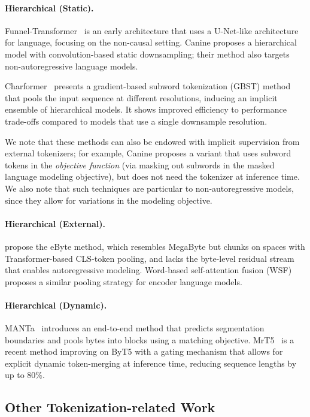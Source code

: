 \documentclass{article}
\newcommand{\citep}{\parencite}
\newcommand{\citet}{\textcite}
\theoremstyle{plain}
\theoremstyle{remark}
\begin{document}
\paragraph{Hierarchical (Static).}
Funnel-Transformer~\citep{dai2020funnel} is an early architecture that uses a U-Net-like architecture for language, focusing on the non-causal setting.
Canine \citep{Canine} proposes a hierarchical model with convolution-based static downsampling; their method also targets non-autoregressive language models.

Charformer~\citep{CharFormer} presents a gradient-based subword tokenization (GBST) method that pools the input sequence at different resolutions, inducing an implicit ensemble of hierarchical models. It shows improved efficiency to performance trade-offs compared to models that use a single downsample resolution.

We note that these methods can also be endowed with implicit supervision from external tokenizers; for example, Canine proposes a variant that uses subword tokens in the \emph{objective function} (via masking out subwords in the masked language modeling objective), but does not need the tokenizer at inference time. We also note that such techniques are particular to non-autoregressive models, since they allow for variations in the modeling objective.

\paragraph{Hierarchical (External).}
\citet{thawani2023learn} propose the eByte method, which resembles MegaByte but chunks on spaces with Transformer-based CLS-token pooling, and lacks the byte-level residual stream that enables autoregressive modeling.
Word-based self-attention fusion (WSF)~\citep{sreedhar2023local} proposes a similar pooling strategy for encoder language models.

\paragraph{Hierarchical (Dynamic).}
MANTa~\citep{godey2022manta} introduces an end-to-end method that predicts segmentation boundaries and pools bytes into blocks using a matching objective.
MrT5~\citep{kallinimrt5} is a recent method improving on ByT5 with a gating mechanism that allows for explicit dynamic token-merging at inference time, reducing sequence lengths by up to 80\%.

\subsection{Other Tokenization-related Work}
\label{sec:background:other} 
\end{document}
